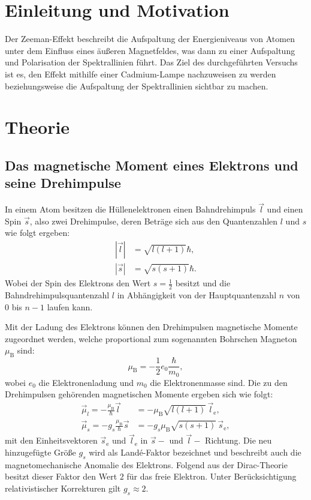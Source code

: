 \section{Einleitung und Motivation}
\label{sec:EinleitungundMotivation}

Der Zeeman-Effekt beschreibt die Aufspaltung der Energieniveaus von Atomen unter dem Einfluss eines äußeren Magnetfeldes, was dann zu einer Aufspaltung und Polarisation der Spektrallinien führt. Das Ziel des durchgeführten Versuchs ist es, den Effekt mithilfe einer Cadmium-Lampe nachzuweisen zu werden beziehungsweise die Aufspaltung der Spektrallinien sichtbar zu machen.

\section{Theorie}
\label{sec:Theorie}

\subsection{Das magnetische Moment eines Elektrons und seine Drehimpulse}
\label{sec:DasmagMoment}
In einem Atom besitzen die Hüllenelektronen einen Bahndrehimpuls $\vec{l}$ und einen Spin $\vec{s}$, also zwei Drehimpulse, deren Beträge sich aus den Quantenzahlen $l$ und $s$ wie folgt ergeben:
\begin{align}
|\vec{l}|&=\sqrt{l(l+1)}\hbar,\\
|\vec{s}|&=\sqrt{s(s+1)}\hbar.
\end{align}
Wobei der Spin des Elektrons den Wert $s = \frac{1}{2}$ besitzt und die Bahndrehimpulsquantenzahl $l$ in Abhängigkeit von der Hauptquantenzahl $n$ von $0$ bis $n-1$ laufen kann. 

Mit der Ladung des Elektrons können den Drehimpulsen magnetische Momente zugeordnet werden, welche proportional zum sogenannten Bohrschen Magneton $\mu_\text{B}$ sind:
\begin{equation}
\mu_{\text{B}} = -\frac{1}{2} e_0 \frac{\hbar}{m_0},
\end{equation}
wobei $e_0$ die Elektronenladung und $m_0$ die Elektronenmasse sind. Die zu den Drehimpulsen gehörenden magnetischen Momente ergeben sich wie folgt:
\begin{align}
\vec{\mu}_l=-\frac{\mu_\text{B}}{\hbar}\vec{l}&=-\mu_\text{B}\sqrt{l(l+1)}\,\vec{l}_\text{e},\\
\vec{\mu}_s=-g_s\frac{\mu_\text{B}}{\hbar}\vec{s}&=-g_s\mu_\text{B}\sqrt{s(s+1)}\,\vec{s}_\text{e},
\end{align}
mit den Einheitsvektoren $\vec{s}_\text{e}$ und $\vec{l}_\text{e}$ in $\vec{s}-$ und $\vec{l}-$ Richtung. Die neu hinzugefügte Größe $g_s$ wird als Landé-Faktor bezeichnet und beschreibt auch die magnetomechanische Anomalie des Elektrons. Folgend aus der Dirac-Theorie besitzt dieser Faktor den Wert $2$ für das freie Elektron. Unter Berücksichtigung relativistischer Korrekturen gilt $g_s \approx 2$.

